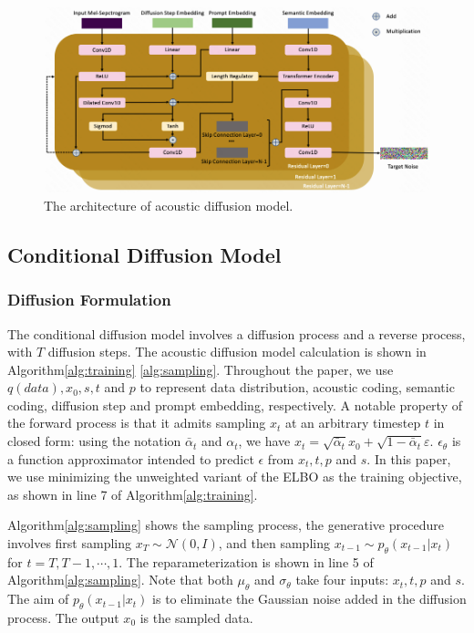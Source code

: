 \documentclass{article}
\begin{document}
\begin{figure}[t]
 \centering
 \includegraphics[width=\linewidth]{diffusion.png}
 \vspace{-20pt}
 \captionsetup{belowskip=-15pt}
 
 \caption{The architecture of acoustic diffusion model.}
 \label{fig:proposed_model}
\end{figure}

\subsection{Conditional Diffusion Model}
\subsubsection{Diffusion  Formulation}
The conditional diffusion model involves a diffusion process and a reverse process, with $T$ diffusion steps. The acoustic diffusion model calculation is shown in Algorithm\ref{alg:training} \ref{alg:sampling}. Throughout the paper, we use $q(data), x_0, s, t$ and $p$ to represent data distribution, acoustic coding, semantic coding, diffusion step and prompt embedding, respectively. A notable property of the forward process is that it admits sampling $x_t$ at an arbitrary timestep $t$ in closed form: using the notation $\bar{\alpha}_t$ and $\alpha_t$, we have $x_t = \sqrt{\bar\alpha_t} x_0 + \sqrt{1-\bar\alpha_t}\varepsilon$. $\epsilon_{\theta}$ is a function approximator intended to predict $\epsilon$ from $x_t, t, p$ and $s$. In this paper, we use minimizing the unweighted variant of the ELBO\cite{ho2020denoising} as the training objective, as shown in line 7 of Algorithm\ref{alg:training}.


Algorithm\ref{alg:sampling} shows the sampling process, the generative procedure involves first sampling $x_T \sim \mathcal{N}(0, I)$, and then sampling $x_{t-1}\sim p_{\theta}(x_{t-1}|x_t)$ for $t=T, T-1,\cdots,1$. The reparameterization is shown in line 5 of Algorithm\ref{alg:sampling}. Note that both $\mu_{\theta}$ and $\sigma_{\theta}$ take four inputs: $x_t, t, p$ and $s$. The aim of $p_{\theta}(x_{t-1}|x_t)$ is to eliminate the Gaussian noise added in the diffusion process. The output $x_0$ is the sampled data. 
\end{document}
